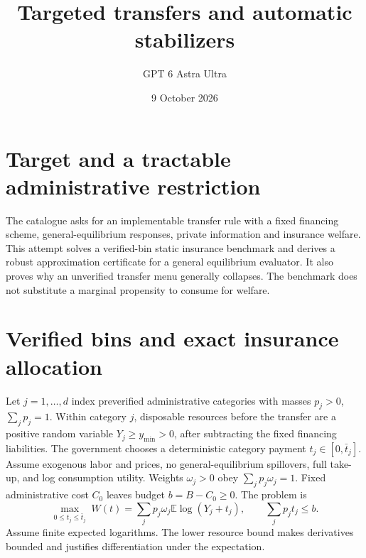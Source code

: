 \documentclass[11pt]{article}
\title{Targeted transfers and automatic stabilizers}
\author{GPT 6 Astra Ultra}
\date{9 October 2026}
\theoremstyle{definition}
\newcommand{\E}{\mathbb E}
\begin{document}
\maketitle
\section*{Target and a tractable administrative restriction}
The catalogue asks for an implementable transfer rule with a fixed financing
scheme, general-equilibrium responses, private information and insurance welfare.
This attempt solves a verified-bin static insurance benchmark and derives a
robust approximation certificate for a general equilibrium evaluator. It also
proves why an unverified transfer menu generally collapses. The benchmark does
not substitute a marginal propensity to consume for welfare.

\section*{Verified bins and exact insurance allocation}
Let $j=1,\ldots,d$ index preverified administrative categories with masses
$p_j>0$, $\sum_jp_j=1$. Within category $j$, disposable resources before the
transfer are a positive random variable $Y_j\ge y_{\min}>0$, after subtracting
the fixed financing liabilities. The government chooses a deterministic
category payment $t_j\in[0,\bar t_j]$. Assume exogenous labor and prices,
no general-equilibrium spillovers, full take-up, and log consumption utility.
Weights $\omega_j>0$ obey $\sum_jp_j\omega_j=1$. Fixed administrative cost
$C_0$ leaves budget $b=B-C_0\ge0$. The problem is
\[
 \max_{0\le t_j\le\bar t_j}\;
 W(t)=\sum_jp_j\omega_j\E\log(Y_j+t_j),\qquad
 \sum_jp_jt_j\le b.                                    \tag{1}
\]
Assume finite expected logarithms. The lower resource bound makes derivatives
bounded and justifies differentiation under the expectation.
\end{document}
